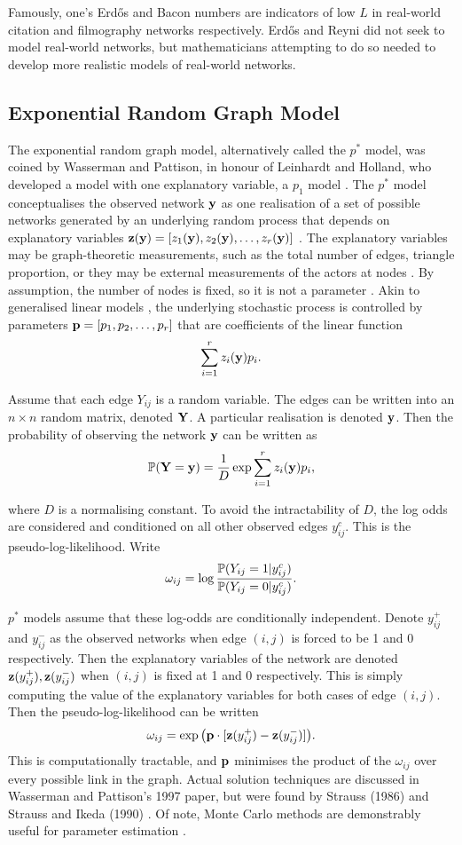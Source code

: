  Famously, one's Erd\H{o}s and Bacon numbers are indicators of low $L$ in real-world citation and filmography networks respectively. Erd\H{o}s and Reyni did not seek to model real-world networks, but mathematicians attempting to do so needed to develop more realistic models of real-world networks.\\
 
 \subsection{Exponential Random Graph Model}
 The exponential random graph model, alternatively called the $p^*$ model, was coined by Wasserman and Pattison, in honour of Leinhardt and Holland, who developed a model with one explanatory variable, a $p_1$ model \cite {RN83}. The $p^*$ model conceptualises the observed network $\mathbf{y}$ as one realisation of a set of possible networks generated by an underlying random process that depends on explanatory variables $\mathbf{z}(\mathbf{y}) = [z_1(\mathbf{y}), z_2(\mathbf{y}), \dots, z_r(\mathbf{y})]$ \cite{RN64}. The explanatory variables may be graph-theoretic measurements, such as the total number of edges, triangle proportion, or they may be external measurements of the actors at nodes \cite{RN86}. By assumption, the number of nodes is fixed, so it is not a parameter \cite{RN64}. Akin to generalised linear models \cite{RN83}, the underlying stochastic process is controlled by parameters $\mathbf{p} = [p_1,p_2,\dots,p_r]$ that are coefficients of the linear function $$\sum_{i=1}^r z_i(\mathbf{y})p_i. $$ 

 
 Assume that each edge $Y_{ij}$ is a random variable. The edges can be written into an $n\times n$ random matrix, denoted $\mathbf{Y}$. A particular realisation is denoted $\mathbf{y}$. Then the probability of observing the network $\mathbf{y}$ can be written as \\
 $$ \mathbb P (\mathbf{Y} = \mathbf{y}) = \frac{1}{D}\exp{\sum_{i=1}^r z_i(\mathbf{y})p_i},$$
 
 where $D$ is a normalising constant. To avoid the intractability of $D$, the log odds are considered and conditioned on all other observed edges $y_{ij}^c$. This is the pseudo-log-likelihood. Write 
 $$\omega_{ij} = \log{\frac{\mathbb P(Y_{ij} =1 | y_{ij}^c)}{\mathbb P(Y_{ij} =0 | y_{ij}^c)}}.$$ 
 
$p^*$ models assume that these log-odds are conditionally independent. Denote $y_{ij}^+$ and $y_{ij}^-$ as the observed networks when edge $(i,j)$ is forced to be 1 and 0 respectively. Then the explanatory variables of the network are denoted $\mathbf{z}(y_{ij}^+), \mathbf{z}(y_{ij}^-) $ when $(i,j)$ is fixed at 1 and 0 respectively. This is simply computing the value of the explanatory variables for both cases of edge $(i,j)$. Then the pseudo-log-likelihood can be written $$
 \omega_{ij} = \exp \big (\mathbf{p} \cdot [\mathbf{z}(y_{ij}^+) - \mathbf{z}(y_{ij}^-)] \big).$$
This is computationally tractable, and $\mathbf{p}$ minimises the product of the $\omega_{ij}$ over every possible link in the graph. Actual solution techniques are discussed in Wasserman and Pattison's 1997 paper, but were found by Strauss (1986) and Strauss and Ikeda (1990) \cite{RN83}. Of note, Monte Carlo methods are demonstrably useful for parameter estimation \cite{RN86}. \\

